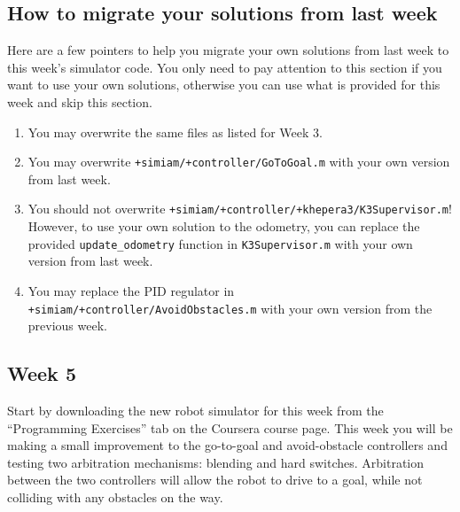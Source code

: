 \documentclass[10pt]{article}
\begin{document}
\subsection*{How to migrate your solutions from last week}

Here are a few pointers to help you migrate your own solutions from last week to this week's simulator code. You only need to pay attention to this section if you want to use your own solutions, otherwise you can use what is provided for this week and skip this section.

\begin{enumerate}
 \item You may overwrite the same files as listed for Week 3.
 \item You may overwrite \texttt{+simiam/+controller/GoToGoal.m} with your own version from last week.
 \item You should not overwrite \texttt{+simiam/+controller/+khepera3/K3Supervisor.m}! However, to use your own solution to the odometry, you can replace the provided \texttt{update\_odometry} function in \texttt{K3Supervisor.m} with your own version from last week.
 \item You may replace the PID regulator in \texttt{+simiam/+controller/AvoidObstacles.m} with your own version from the previous week.
\end{enumerate}

\subsection{Week 5}
Start by downloading the new robot simulator for this week from the ``Programming Exercises'' tab on the Coursera course page. This week you will be making a small improvement to the go-to-goal and avoid-obstacle controllers and testing two arbitration mechanisms: blending and hard switches. Arbitration between the two controllers will allow the robot to drive to a goal, while not colliding with any obstacles on the way.
\end{document}

